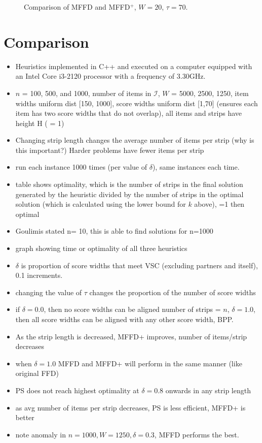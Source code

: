 \documentclass[oribibl]{llncs}
\begin{document}
\begin{figure}[h!]	
	\centering
	
	\caption{Comparison of MFFD and MFFD$^+$, $W = 20$, $\tau = 70$.}	
	\label{fig:comparestrips}
\end{figure}


\section{Comparison}
\begin{itemize}
	\item Heuristics implemented in C++ and executed on a computer equipped with an Intel Core i3-2120 processor with a frequency of 3.30GHz.
	\item $n$ = 100, 500, and 1000, number of items in $\mathcal{I}$, $W$ = 5000, 2500, 1250, item widths uniform dist [150, 1000], score widths uniform dist [1,70] (ensures each item has two score widths that do not overlap), all items and strips have height H ( = 1)
	\item Changing strip length changes the average number of items per strip (why is this important?) Harder problems have fewer items per strip
	\item run each instance 1000 times (per value of $\delta$), same instances each time.
	\item table shows optimality, which is the number of strips in the final solution generated by the heuristic divided by the number of strips in the optimal solution (which is calculated using the lower bound for $k$ above), =1 then optimal
	\item Goulimis stated n= 10, this is able to find solutions for n=1000
	\item graph showing time or optimality of all three heuristics
	\item $\delta$ is proportion of score widths that meet VSC (excluding partners and itself), 0.1 increments.
	\item changing the value of $\tau$ changes the proportion of the number of score widths
	\item if $\delta = 0.0$, then no score widths can be aligned number of strips = $n$, $\delta = 1.0$, then all score widths can be aligned with any other score width, BPP.
	\item As the strip length is decreased, MFFD+ improves, number of items/strip decreases
	\item when $\delta = 1.0$ MFFD and MFFD+ will perform in the same manner (like original FFD)
	\item PS does not reach highest optimality at $\delta = 0.8$ onwards in any strip length
	\item as avg number of items per strip decreases, PS is less efficient, MFFD+ is better
	\item note anomaly in $n = 1000, W = 1250, \delta = 0.3$, MFFD performs the best.
\end{itemize}
\end{document}
